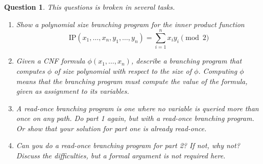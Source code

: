 \documentclass[12pt,a4paper]{report}
\newtheorem{question}{Question}
\theoremstyle{definition}
\begin{document}
    \begin{question} This questions is broken in several tasks.

        \begin{enumerate}
            \item Show a polynomial size branching program for the inner product function
            \[\mathrm{IP}(x_1, \ldots, x_n, y_1, \ldots, y_n) = \sum_{i = 1}^n x_iy_i \pmod{2}\]
            
            \item Given a CNF formula $\phi(x_1, \ldots , x_n)$, describe a branching program that computes $\phi$ of size polynomial with respect to the size of $\phi$. Computing $\phi$ means that the branching program must compute the value of the formula, given as assignment to its variables.
            \item A read-once branching program is one where no variable is queried more than once on any path. Do part 1 again, but with a read-once branching program. Or show that your solution for part one is already read-once.
            \item Can you do a read-once branching program for part 2? If not, why not? Discuss the difficulties, but a formal argument is not required here.
        \end{enumerate}
    \end{question}
\end{document}
